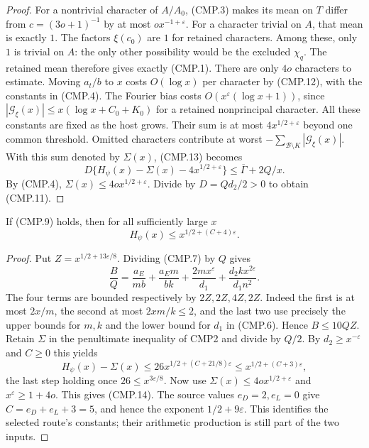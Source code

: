 \begin{proof}
For a nontrivial character of $A/A_0$, (CMP.3) makes its mean on
$T$ differ from $c=(3o+1)^{-1}$ by at most
$ox^{-1+\varepsilon}$.  For a character trivial on $A$, that
mean is exactly $1$.  The factors $\xi(c_0)$ are $1$ for
retained characters.  Among these, only $1$ is trivial on $A$:
the only other possibility would be the excluded $\chi_q$.
The retained mean therefore gives exactly (CMP.1).  There are
only $4o$ characters to estimate.  Moving $a_t/b$ to $x$ costs
$O(\log x)$ per character by (CMP.12), with the constants in
(CMP.4).  The Fourier bias costs
$O(x^\varepsilon(\log x+1))$, since
$|\mathcal G_\xi(x)|\le x(\log x+C_0+K_0)$ for a retained
nonprincipal character.  All these constants are fixed as the
host grows.  Their sum is at most $4x^{1/2+\varepsilon}$ beyond
one common threshold.  Omitted characters contribute at worst
$-\sum_{\mathcal B\setminus K}|\mathcal G_\xi(x)|$.
With this sum denoted by $\Sigma(x)$, (CMP.13) becomes
\[
 D\{H_\psi(x)-\Sigma(x)-4x^{1/2+\varepsilon}\}
                       \le\overline\Gamma+2Q/x.
\]
By (CMP.4), $\Sigma(x)\le4o x^{1/2+\varepsilon}$.
Divide by $D=Qd_2/2>0$ to obtain (CMP.11).
\end{proof}

\begin{proposition}
\label{claim:CMP3}
If (CMP.9) holds, then for all sufficiently large $x$
\[
                     H_\psi(x)\le x^{1/2+(C+4)\varepsilon}.
 \tag{CMP.14}
\]
\end{proposition}
\begin{proof}
Put $Z=x^{1/2+13\varepsilon/8}$.  Dividing (CMP.7) by $Q$ gives
\[
 \frac BQ=\frac{a_E}{mb}+\frac{a_Em}{bk}
           +\frac{2mx^\varepsilon}{d_1}
           +\frac{d_2kx^{2\varepsilon}}{d_1n^2}.
\]
The four terms are bounded respectively by $2Z,2Z,4Z,2Z$.
Indeed the first is at most $2x/m$, the second at most
$2xm/k\le2$, and the last two use precisely the upper bounds
for $m,k$ and the lower bound for $d_1$ in (CMP.6).
Hence $B\le10QZ$.
Retain $\Sigma$ in the penultimate inequality of CMP2 and divide
by $Q/2$.  By $d_2\ge x^{-\varepsilon}$ and $C\ge0$ this yields
\[
 H_\psi(x)-\Sigma(x)
          \le26x^{1/2+(C+21/8)\varepsilon}
          \le x^{1/2+(C+3)\varepsilon},
\]
the last step holding once $26\le x^{3\varepsilon/8}$.
Now use $\Sigma(x)\le4o x^{1/2+\varepsilon}$ and
$x^\varepsilon\ge1+4o$.  This gives (CMP.14).
The source values $e_D=2,e_L=0$ give
$C=e_D+e_L+3=5$, and hence the exponent $1/2+9\varepsilon$.
This identifies the selected route's constants; their arithmetic
production is still part of the two inputs.
\end{proof}

